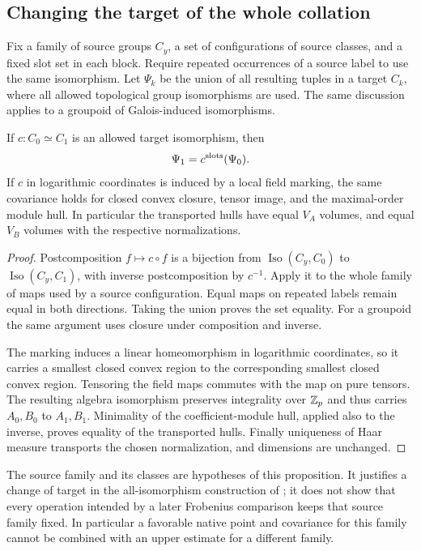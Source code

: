 \subsection{Changing the target of the whole collation}
\label{sec:target-reset}
Fix a family of source groups $C_y$, a set of configurations of source
classes, and a fixed slot set in each block. Require repeated occurrences
of a source label to use the same isomorphism. Let $\Psi_k$ be the union
of all resulting tuples in a target $C_k$, where all allowed topological
group isomorphisms are used. The same discussion applies to a groupoid
of Galois-induced isomorphisms.

\begin{proposition}
\label{prop:target-reset}
If $c:C_0\simeq C_1$ is an allowed target isomorphism, then
\[
 \Psi_1=c^{\rm slots}(\Psi_0).
\]
If $c$ in logarithmic coordinates is induced by a local field marking,
the same covariance holds for closed convex closure, tensor image,
and the maximal-order module hull. In particular the transported hulls
have equal $V_A$ volumes, and equal $V_B$ volumes with the respective
normalizations.
\end{proposition}
\begin{proof}
Postcomposition $f\mapsto c\circ f$ is a bijection from
$\operatorname{Iso}(C_y,C_0)$ to $\operatorname{Iso}(C_y,C_1)$,
with inverse postcomposition by $c^{-1}$. Apply it to the whole family
of maps used by a source configuration. Equal maps on repeated labels
remain equal in both directions. Taking the union proves the set equality.
For a groupoid the same argument uses closure under composition and inverse.

The marking induces a linear homeomorphism in logarithmic coordinates,
so it carries a smallest closed convex region to the corresponding
smallest closed convex region. Tensoring the field maps commutes with
the map on pure tensors. The resulting algebra isomorphism preserves
integrality over $\mathbb Z_p$ and thus carries $A_0,B_0$ to $A_1,B_1$.
Minimality of the coefficient-module hull, applied also to the inverse,
proves equality of the transported hulls. Finally uniqueness of Haar
measure transports the chosen normalization, and dimensions are unchanged.
\end{proof}

The source family and its classes are hypotheses of this proposition.
It justifies a change of target in the all-isomorphism construction of
\cite[Section~9.7.5.1]{JoshiIII}; it does not show that every operation
intended by a later Frobenius comparison keeps that source family fixed.
In particular a favorable native point and covariance for this family
cannot be combined with an upper estimate for a different family.

